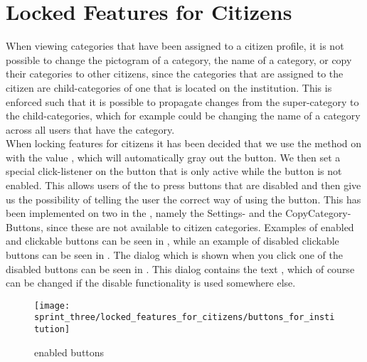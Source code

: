 
\section{Locked Features for Citizens}
\label{sec:locked_features_for_citizens}

When viewing categories that have been assigned to a citizen profile, it is not possible to change the pictogram of a category, the name of a category, or copy their categories to other citizens, since the categories that are assigned to the citizen are child-categories of one that is located on the institution. This is enforced such that it is possible to propagate changes from the super-category to the child-categories, which for example could be changing the name of a category across all users that have the category.\\

When locking features for citizens it has been decided that we use the  method on  with the value , which will automatically gray out the button. We then set a special click-listener on the button that is only active while the button is not enabled. This allows users of the \ct to press buttons that are disabled and then give us the possibility of telling the user the correct way of using the button. This has been implemented on two  in the \ct, namely the Settings- and the CopyCategory-Buttons, since these are not available to citizen categories. Examples of enabled and clickable buttons can be seen in , while an example of disabled clickable buttons can be seen in . The dialog which is shown when you click one of the disabled buttons can be seen in . This dialog contains the text , which of course can be changed if the disable functionality is used somewhere else. 

\begin{figure}[!htbp]
        \centering
        \texttt{[image: sprint\_three/locked\_features\_for\_citizens/buttons\_for\_institution]}
        \caption{\ct enabled buttons}
        \label{fig:ct_enabled_buttons}
\end{figure}

